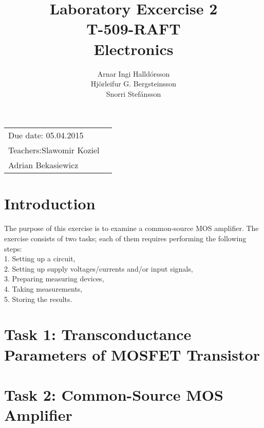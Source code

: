 \documentclass[11pt,a4paper]{article}
\title{Laboratory Excercise 2 \\ T-509-RAFT \\ Electronics} %
\author{Arnar Ingi Halldórsson \\ Hjörleifur G. Bergsteinsson \\ Snorri Stefánsson} %
\begin{document}
\maketitle %

\begin{tabular}{lr}
    Due date: 05.04.2015 \\
    Teachers:\qquad Slawomir Koziel\\ %
\qquad \qquad \qquad Adrian Bekasiewicz
\end{tabular}

\setlength\parindent{0pt} %

\renewcommand{\labelenumi}{\alph{enumi}.} %

\section*{Introduction}

    The  purpose  of  this  exercise  is to  examine a common-source MOS amplifier. The exercise consists of two tasks; each of them requires performing the following steps:\\
        1. Setting up a circuit,\\
        2. Setting up supply voltages/currents and/or input signals, \\
        3. Preparing measuring devices, \\
        4. Taking measurements, \\
        5. Storing the results. \\

\pagebreak

\section*{Task 1: Transconductance Parameters of MOSFET Transistor}
    
\pagebreak
\section*{Task 2: Common-Source MOS Amplifier}
    
\end{document}
